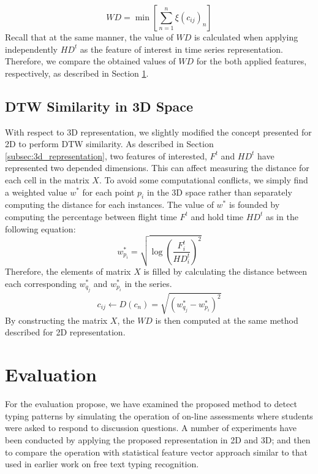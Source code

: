 \documentclass[runningheads,a4paper]{llncs}
\begin{document}
    
\begin{equation}
WD = \min[{\sum_{n=1}^{n} \xi(c_{ij})_n}]
\end{equation}
\noindent Recall that at the same manner, the value of $WD$ is calculated when applying independently $HD^t$ as the feature of interest in time series representation. Therefore, we compare the obtained values of $WD$ for the both applied features, respectively, as described in Section \ref{sec:experiment}.
   
\subsection{DTW Similarity in 3D Space} \label{subsec:3d_similairty}
With respect to 3D representation, we slightly modified the concept presented for 2D to perform DTW similarity. As described in Section \ref{subsec:3d_representation}, two features of interested, $F^t$ and $HD^t$ have represented two depended dimensions. This can affect measuring the distance for each cell in the matrix $X$. To avoid some computational conflicts, we simply find a weighted value $w^*$ for each point $p_i$ in the 3D space rather than separately computing the distance for each instances. The value of $w^*$ is founded by computing the percentage between flight time $F^t$ and hold time $HD^t$ as in the following equation:
\begin{equation}
w^*_{p_i}=\sqrt{\log\left(\frac{F^t_i}{HD^t_i}\right)^2}
\end{equation}
\noindent Therefore, the elements of matrix $X$ is filled by calculating the distance between each corresponding $w^*_{q_j}$ and $w^*_{p_i}$ in the series.
\begin{equation}
c_{ij}\leftarrow D(c_n) =\sqrt{(w^*_{q_j}-w^*_{p_i})^2}
\end{equation}
\noindent By constructing the matrix $X$, the $WD$ is then computed at the same method described for 2D representation. 
 

\section{Evaluation} \label{sec:experiment}
For the evaluation propose, we have examined the proposed method to detect typing patterns by simulating the operation of on-line assessments where students were asked to respond to discussion questions. A number of experiments have been conducted by applying the proposed representation in 2D and 3D; and then to compare the operation with statistical feature vector approach similar to that used in earlier work on free text typing recognition.
\end{document}
